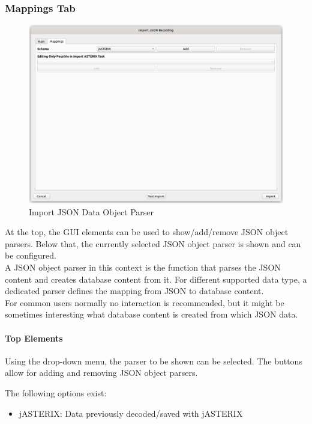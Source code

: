 \subsubsection{Mappings Tab}

\begin{figure}[H]
    \hspace*{-0.5cm}
    \includegraphics[width=17cm,frame]{figures/import_json_data_object_parser.png}
  \caption{Import JSON Data Object Parser}
\end{figure}

At the top, the GUI elements can be used to show/add/remove JSON object parsers. Below that, the currently selected JSON object parser is shown and can be configured. \\

A JSON object parser in this context is the function that parses the JSON content and creates database content from it. For different supported data type, a dedicated parser defines the mapping from JSON to database content. \\

For common users normally no interaction is recommended, but it might be sometimes interesting what database content is created from which JSON data.

\paragraph{Top Elements}

Using the drop-down menu, the parser to be shown can be selected. The buttons allow for adding and removing JSON object parsers.

The following options exist:
\begin{itemize}  
\item jASTERIX: Data previously decoded/saved with jASTERIX
\end{itemize}
\ \\

